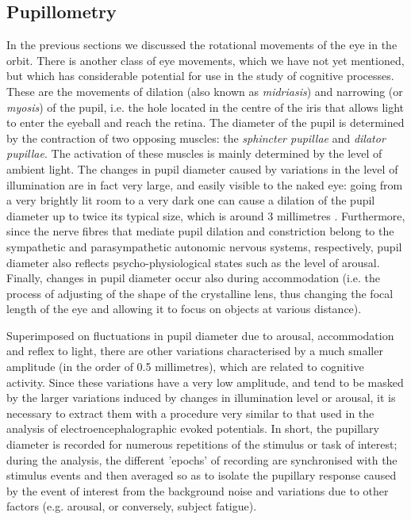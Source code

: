 \documentclass[11pt]{article}
\begin{document}
\subsection{Pupillometry}

In the previous sections we discussed the rotational movements of the eye in the orbit. There is another class of eye movements, which we have not yet mentioned, but which has considerable potential for use in the study of cognitive processes. These are the movements of dilation (also known as \textit{midriasis}) and narrowing (or \textit{myosis}) of the pupil, i.e. the hole located in the centre of the iris that allows light to enter the eyeball and reach the retina. The diameter of the pupil is determined by the contraction of two opposing muscles: the \textit{sphincter pupillae} and \textit{dilator pupillae}. The activation of these muscles is mainly determined by the level of ambient light. The changes in pupil diameter caused by variations in the level of illumination are in fact very large, and easily visible to the naked eye: going from a very brightly lit room to a very dark one can cause a dilation of the pupil diameter up to twice its typical size, which is around 3 millimetres \cite{MacLachlan2002}. Furthermore, since the nerve fibres that mediate pupil dilation and constriction belong to the sympathetic and parasympathetic autonomic nervous systems, respectively, pupil diameter also reflects psycho-physiological states such as the level of arousal. Finally, changes in pupil diameter occur also during accommodation (i.e. the process of adjusting of the shape of the crystalline lens, thus changing the focal length of the eye and allowing it to focus on objects at various distance).

Superimposed on fluctuations in pupil diameter due to arousal, accommodation and reflex to light, there are other variations characterised by a much smaller amplitude (in the order of 0.5 millimetres), which are related to cognitive activity. Since these variations have a very low amplitude, and tend to be masked by the larger variations induced by changes in illumination level or arousal, it is necessary to extract them with a procedure very similar to that used in the analysis of electroencephalographic evoked potentials. In short, the pupillary diameter is recorded for numerous repetitions of the stimulus or task of interest; during the analysis, the different 'epochs' of recording are synchronised with the stimulus events and then averaged so as to isolate the pupillary response caused by the event of interest from the background noise and variations due to other factors (e.g. arousal, or conversely, subject fatigue).
\end{document}
